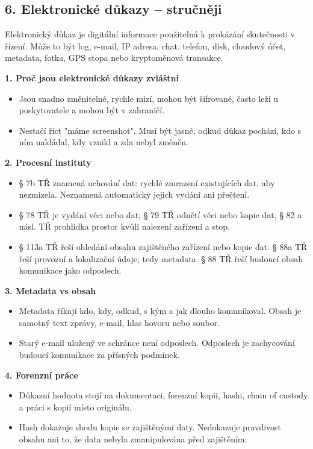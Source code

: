 
\subsection*{6. Elektronické důkazy -- stručněji}
Elektronický důkaz je digitální informace použitelná k prokázání skutečnosti v řízení. Může to být log, e-mail, IP adresa, chat, telefon, disk, cloudový účet, metadata, fotka, GPS stopa nebo kryptoměnová transakce.

\textbf{1. Proč jsou elektronické důkazy zvláštní}
\begin{itemize}
  \item Jsou snadno změnitelné, rychle mizí, mohou být šifrované, často leží u poskytovatele a mohou být v zahraničí.
  \item Nestačí říct "máme screenshot". Musí být jasné, odkud důkaz pochází, kdo s ním nakládal, kdy vznikl a zda nebyl změněn.
\end{itemize}

\textbf{2. Procesní instituty}
\begin{itemize}
  \item § 7b TŘ znamená uchování dat: rychlé zmrazení existujících dat, aby nezmizela. Neznamená automaticky jejich vydání ani přečtení.
  \item § 78 TŘ je vydání věci nebo dat, § 79 TŘ odnětí věci nebo kopie dat, § 82 a násl. TŘ prohlídka prostor kvůli nalezení zařízení a stop.
  \item § 113a TŘ řeší ohledání obsahu zajištěného zařízení nebo kopie dat. § 88a TŘ řeší provozní a lokalizační údaje, tedy metadata. § 88 TŘ řeší budoucí obsah komunikace jako odposlech.
\end{itemize}

\textbf{3. Metadata vs obsah}
\begin{itemize}
  \item Metadata říkají kdo, kdy, odkud, s kým a jak dlouho komunikoval. Obsah je samotný text zprávy, e-mail, hlas hovoru nebo soubor.
  \item Starý e-mail uložený ve schránce není odposlech. Odposlech je zachycování budoucí komunikace za přísných podmínek.
\end{itemize}

\textbf{4. Forenzní práce}
\begin{itemize}
  \item Důkazní hodnota stojí na dokumentaci, forenzní kopii, hashi, chain of custody a práci s kopií místo originálu.
  \item Hash dokazuje shodu kopie se zajištěnými daty. Nedokazuje pravdivost obsahu ani to, že data nebyla zmanipulována před zajištěním.
\end{itemize}


